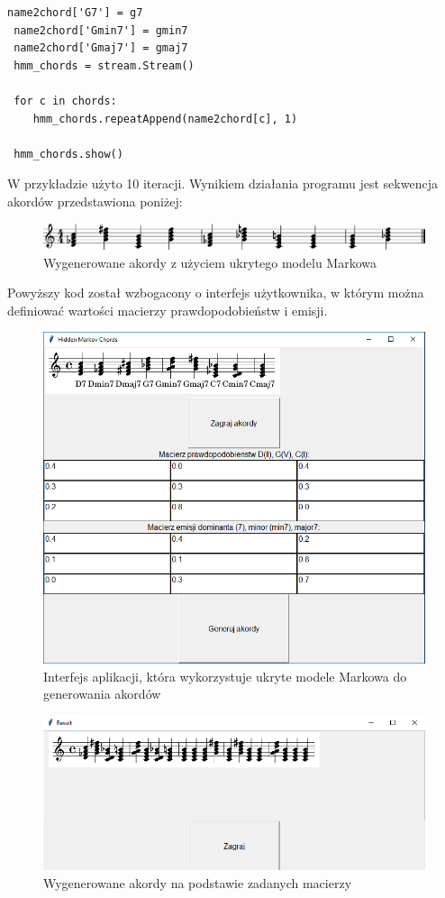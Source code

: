 \begin{przyklad}
\begin{lstlisting}[caption={Ukryty Model Markowa z użyciem Pythona},captionpos=b]
 name2chord['G7'] = g7
 name2chord['Gmin7'] = gmin7
 name2chord['Gmaj7'] = gmaj7
 hmm_chords = stream.Stream()
 
 for c in chords:
 	hmm_chords.repeatAppend(name2chord[c], 1)
 
 hmm_chords.show()
	\end{lstlisting}
	W przykładzie użyto 10 iteracji. Wynikiem działania programu jest sekwencja akordów przedstawiona poniżej:
	
	\begin{figure}[H]
		\centering
		\includegraphics[width=0.7\linewidth]{hmm_music_notes}
		\caption{Wygenerowane akordy z użyciem ukrytego modelu Markowa}
		\label{fig:hmmmusicnotes}
	\end{figure}
	
	
	
\end{przyklad}

Powyższy kod został wzbogacony o interfejs użytkownika, w którym można definiować wartości macierzy prawdopodobieństw i emisji.

\begin{figure}[H]
	\centering
	\includegraphics[width=0.7\linewidth]{hidden_markov_python}
	\caption{Interfejs aplikacji, która wykorzystuje ukryte modele Markowa do generowania akordów}
	\label{fig:hiddenmarkovpython}
\end{figure}


\begin{figure}[H]
	\centering
	\includegraphics[width=0.7\linewidth]{hidden_markov_python_result}
	\caption{Wygenerowane akordy na podstawie zadanych macierzy}
	\label{fig:hiddenmarkovpythonresult}
\end{figure}

